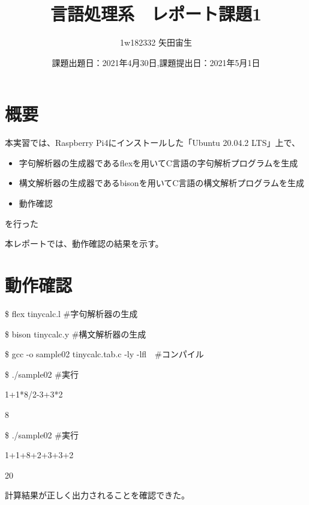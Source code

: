 \documentclass[dvipdfmx,uplatex,titlepage]{jsarticle}
\title{言語処理系　レポート課題1}
\author{1w182332 矢田宙生}
\date{課題出題日：2021年4月30日,課題提出日：2021年5月1日}
\begin{document}
\maketitle

\section{概要}
本実習では、Raspberry Pi4にインストールした「Ubuntu 20.04.2 LTS」上で、
\begin{itemize}
  \item 字句解析器の生成器であるflexを用いてC言語の字句解析プログラムを生成
  \item 構文解析器の生成器であるbisonを用いてC言語の構文解析プログラムを生成
  \item 動作確認
\end{itemize}

を行った

本レポートでは、動作確認の結果を示す。

\section{動作確認}

\$ flex tinycalc.l \#字句解析器の生成

\$ bison tinycalc.y \#構文解析器の生成

\$ gcc -o sample02 tinycalc.tab.c -ly -lfl　\#コンパイル

\$ ./sample02 \#実行

1+1*8/2-3+3*2

8

\$ ./sample02 \#実行

1+1+8+2+3+3+2

20

計算結果が正しく出力されることを確認できた。
\end{document}
